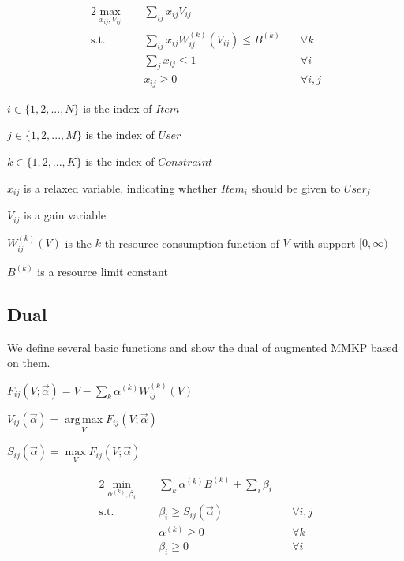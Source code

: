 \documentclass[sigconf]{acmart}
\DeclareMathOperator*{\argmax}{arg\,max}
\newcommand{\sumi}{\sum\limits_i}
\newcommand{\sumj}{\sum\limits_j}
\newcommand{\sumk}{\sum\limits_k}
\newcommand{\sumij}{\sum\limits_{ij}}
\newcommand{\sx}{x_{ij}}
\newcommand{\sV}{V_{ij}}
\newcommand{\sW}{W_{ij}^{(k)}}
\newcommand{\sB}{B^{(k)}}
\newcommand{\inRange}[1]{\in\{1,2,...,#1\}}
\newcommand{\salpha}{\alpha^{(k)}}
\newcommand{\sbeta}{\beta_i}
\newcommand{\sF}{F_{ij}}
\newcommand{\sS}{S_{ij}}
\newcommand{\valpha}{\vec{\alpha}}
\newcommand{\ammkpresourceconstraint}{\sumij \sx \sW(\sV) \le \sB}
\newcommand{\assignmentconstraint}{\sumj \sx \le 1}
\newcommand{\scoreconstraint}{\sbeta \ge \sS(\vec{\alpha})}
\begin{document}
\begin{alignat}{2}
    \max\limits_{\sx, \sV} \quad & \sumij \sx \sV \quad              & {} \\
    \mbox{s.t.} \quad            & \ammkpresourceconstraint \quad    & \forall k \\
    \quad                        & \assignmentconstraint \quad       & \forall i \\
    \quad                        & \sx \ge 0 \quad                   & \forall i,j
\end{alignat}

$i \inRange{N}$ is the index of $Item$

$j \inRange{M}$ is the index of $User$

$k \inRange{K}$ is the index of $Constraint$

$\sx$ is a relaxed variable, indicating whether $Item_i$ should be given to $User_j$

$\sV$ is a gain variable

$\sW(V)$ is the $k$-th resource consumption function of $V$ with support $[0, \infty)$

$\sB$ is a resource limit constant

\subsection{Dual}

We define several basic functions and show the dual of augmented MMKP based on them.

\begin{definition}
$\sF(V; \valpha) = V - \sumk \salpha \sW(V)$
\end{definition}

\begin{definition}
$\sV(\valpha) = \argmax\limits_V \sF(V; \valpha)$
\end{definition}

\begin{definition}
$\sS(\valpha) = \max\limits_V \sF(V; \valpha)$
\end{definition}

\begin{alignat}{2}
    \min\limits_{\salpha, \sbeta} \quad & \sumk \salpha \sB + \sumi \sbeta \quad   & {} \\
    \mbox{s.t.} \quad                   & \scoreconstraint \quad                   & \forall i,j \\
    \quad                               & \salpha \ge 0 \quad                      & \forall k \\
    \quad                               & \sbeta \ge 0 \quad                       & \forall i
\end{alignat}
\end{document}
